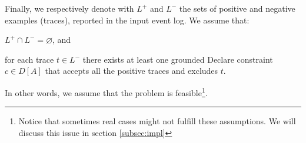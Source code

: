  Finally, we respectively denote with $L^+$ and $L^-$ the sets of positive and negative examples (traces), reported in the input event log. We assume that:
\begin{enumerate*}[label=(\textit{\roman*})]
\item $L^+ \cap L^- = \varnothing$, and 
\item for each trace $t \in L^-$ there exists at least one grounded Declare constraint $c \in D[A]$ that accepts all the positive traces and excludes $t$.
\end{enumerate*}
In other words, we assume that the problem is feasible\footnote{Notice that sometimes real cases might not fulfill these assumptions. We will discuss this issue in section \ref{subsec:impl}}.





